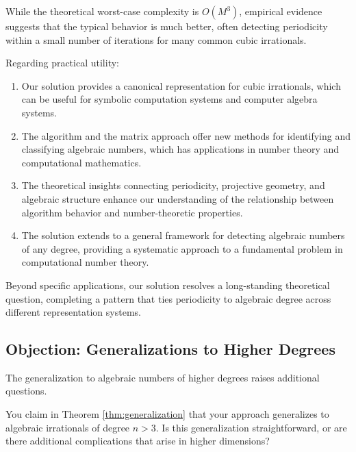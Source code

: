 \begin{response}
While the theoretical worst-case complexity is $O(M^3)$, empirical evidence suggests that the typical behavior is much better, often detecting periodicity within a small number of iterations for many common cubic irrationals.

Regarding practical utility:
\begin{enumerate}
    \item Our solution provides a canonical representation for cubic irrationals, which can be useful for symbolic computation systems and computer algebra systems.
    
    \item The \HAPD{} algorithm and the matrix approach offer new methods for identifying and classifying algebraic numbers, which has applications in number theory and computational mathematics.
    
    \item The theoretical insights connecting periodicity, projective geometry, and algebraic structure enhance our understanding of the relationship between algorithm behavior and number-theoretic properties.
    
    \item The solution extends to a general framework for detecting algebraic numbers of any degree, providing a systematic approach to a fundamental problem in computational number theory.
\end{enumerate}

Beyond specific applications, our solution resolves a long-standing theoretical question, completing a pattern that ties periodicity to algebraic degree across different representation systems.
\end{response}

\subsection{Objection: Generalizations to Higher Degrees}

The generalization to algebraic numbers of higher degrees raises additional questions.

\begin{objection}
You claim in Theorem \ref{thm:generalization} that your approach generalizes to algebraic irrationals of degree $n > 3$. Is this generalization straightforward, or are there additional complications that arise in higher dimensions?
\end{objection}

